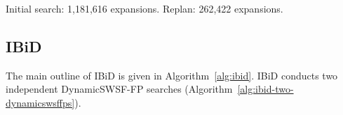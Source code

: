 \begin{marginfigure}%
   \centering%
   
   \caption{Initial search: 1,181,616 expansions.
      Replan: 262,422 expansions.}%
\end{marginfigure}






\subsection{IBiD}

The main outline of IBiD is given in Algorithm~\ref{alg:ibid}.
IBiD conducts two independent DynamicSWSF-FP searches
(Algorithm~\ref{alg:ibid-two-dynamicswsffps}).

